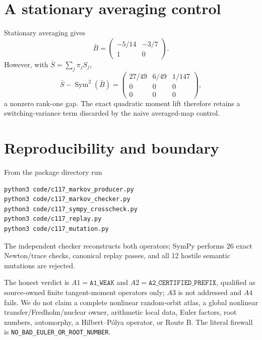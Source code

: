 \documentclass[10pt]{article}
\begin{document}
\section{A stationary averaging control}
Stationary averaging gives
\[
 \bar B=\begin{pmatrix}-5/14&-3/7\\1&0\end{pmatrix}.
\]
However, with $\bar S=\sum_j\pi_jS_j$,
\[
 \bar S-\operatorname{Sym}^2(\bar B)=
 \begin{pmatrix}27/49&6/49&1/147\\0&0&0\\0&0&0\end{pmatrix},
\]
a nonzero rank-one gap.  The exact quadratic moment lift therefore retains a
switching-variance term discarded by the naive averaged-map control.

\section{Reproducibility and boundary}
From the package directory run
\begin{verbatim}
python3 code/c117_markov_producer.py
python3 code/c117_markov_checker.py
python3 code/c117_sympy_crosscheck.py
python3 code/c117_replay.py
python3 code/c117_mutation.py
\end{verbatim}
The independent checker reconstructs both operators; SymPy performs 26 exact
Newton/trace checks, canonical replay passes, and all 12 hostile semantic
mutations are rejected.

The honest verdict is $A1=\texttt{A1\_WEAK}$ and
$A2=\texttt{A2\_CERTIFIED\_PREFIX}$, qualified as source-owned finite
tangent-moment operators only; $A3$ is not addressed and $A4$ fails.  We do
not claim a complete nonlinear random-orbit atlas, a global nonlinear
transfer/Fredholm/nuclear owner, arithmetic local data, Euler factors, root
numbers, automorphy, a Hilbert--P\'olya operator, or Route B.  The literal
firewall is \texttt{NO\_BAD\_EULER\_OR\_ROOT\_NUMBER}.
\end{document}
